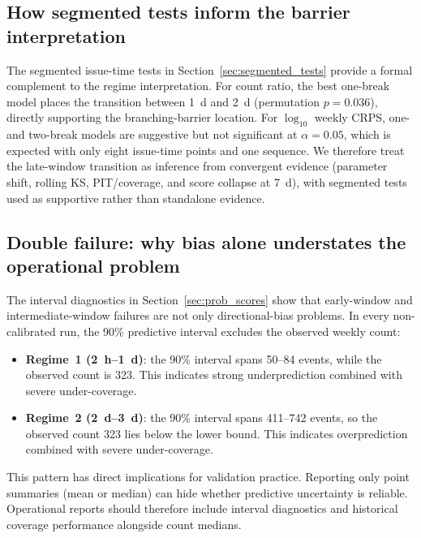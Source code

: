 \documentclass[12pt,letterpaper]{article}
\begin{document}
\subsection{How segmented tests inform the barrier interpretation}

The segmented issue-time tests in Section~\ref{sec:segmented_tests} provide a
formal complement to the regime interpretation. For count ratio, the best
one-break model places the transition between 1~d and 2~d
(permutation $p=0.036$), directly supporting the branching-barrier location.
For $\log_{10}$ weekly CRPS, one- and two-break models are suggestive but not
significant at $\alpha=0.05$, which is expected with only eight issue-time
points and one sequence. We therefore treat the late-window transition as
inference from convergent evidence (parameter shift, rolling KS, PIT/coverage,
and score collapse at 7~d), with segmented tests used as supportive rather than
standalone evidence.

\subsection{Double failure: why bias alone understates the operational problem}
\label{sec:double_failure}

The interval diagnostics in Section~\ref{sec:prob_scores} show that
early-window and intermediate-window failures are not only directional-bias
problems. In every non-calibrated run, the 90\% predictive interval excludes
the observed weekly count:

\begin{itemize}
    \item \textbf{Regime~1 (2~h--1~d)}: the 90\% interval spans 50--84 events,
    while the observed count is 323. This indicates strong underprediction
    combined with severe under-coverage.

    \item \textbf{Regime~2 (2~d--3~d)}: the 90\% interval spans 411--742 events,
    so the observed count 323 lies below the lower bound. This indicates
    overprediction combined with severe under-coverage.
\end{itemize}

This pattern has direct implications for validation practice. Reporting only
point summaries (mean or median) can hide whether predictive uncertainty is
reliable. Operational reports should therefore include interval diagnostics and
historical coverage performance alongside count medians.
\end{document}
